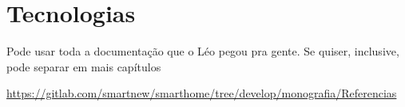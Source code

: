 \chapter{Tecnologias}

Pode usar toda a documentação que o Léo pegou pra gente. Se quiser, inclusive, 
pode separar em mais capítulos

\url{https://gitlab.com/smartnew/smarthome/tree/develop/monografia/Referencias}
